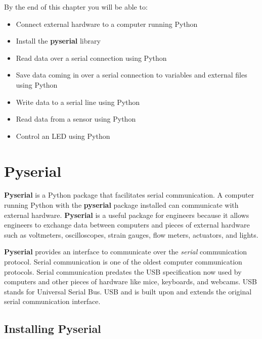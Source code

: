 \documentclass{book}
\begin{document}
    
        By the end of this chapter you will be able to:

\begin{itemize}
\item
  Connect external hardware to a computer running Python
\item
  Install the \textbf{pyserial} library
\item
  Read data over a serial connection using Python
\item
  Save data coming in over a serial connection to variables and external
  files using Python
\item
  Write data to a serial line using Python
\item
  Read data from a sensor using Python
\item
  Control an LED using Python
\end{itemize}
    




    
        \section{Pyserial}\label{pyserial}
    




    
        \textbf{Pyserial} is a Python package that facilitates serial
communication. A computer running Python with the \textbf{pyserial}
package installed can communicate with external hardware.
\textbf{Pyserial} is a useful package for engineers because it allows
engineers to exchange data between computers and pieces of external
hardware such as voltmeters, oscilloscopes, strain gauges, flow meters,
actuators, and lights.

\textbf{Pyserial} provides an interface to communicate over the
\emph{serial} communication protocol. Serial communication is one of the
oldest computer communication protocols. Serial communication predates
the USB specification now used by computers and other pieces of hardware
like mice, keyboards, and webcams. USB stands for Universal Serial Bus.
USB and is built upon and extends the original serial communication
interface.
    




    
        \subsection{Installing Pyserial}\label{installing-pyserial}
    
\end{document}
